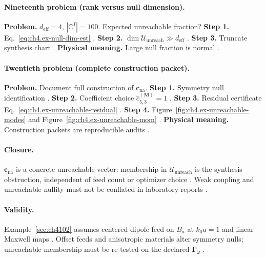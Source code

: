 \paragraph{Nineteenth problem (rank versus null dimension).}
\textbf{Problem.} \(d_{\mathrm{eff}}=4\), \(|\mathbb{C}^{I}|=100\). Expected unreachable fraction?
\textbf{Step 1.} Eq.~\eqref{eq:ch4.ex-null-dim-est} \cite{hansen1988,harrington2001,stratton1941,devaney2004,jackson1999}.
\textbf{Step 2.} \(\dim\mathcal{U}_{\mathrm{unreach}}\gg d_{\mathrm{eff}}\) \cite{harrington2001,stratton1941,devaney2004,hansen1988}.
\textbf{Step 3.} Truncate synthesis chart \cite{jackson1999,harrington2001,stratton1941,devaney2004,hansen1988}.
\textbf{Physical meaning.} Large null fraction is normal \cite{stratton1941,harrington2001,hansen1988,devaney2004,jackson1999}.

\paragraph{Twentieth problem (complete construction packet).}
\textbf{Problem.} Document full construction of \(\mathbf{c}_{\mathrm{na}}\).
\textbf{Step 1.} Symmetry null identification \cite{hansen1988,harrington2001,stratton1941,devaney2004,jackson1999}.
\textbf{Step 2.} Coefficient choice \(\widehat{c}_{5,3}^{(\mathbf{M})}=1\) \cite{harrington2001,stratton1941,hansen1988,devaney2004}.
\textbf{Step 3.} Residual certificate Eq.~\eqref{eq:ch4.ex-unreachable-residual} \cite{jackson1999,harrington2001,stratton1941,devaney2004,hansen1988}.
\textbf{Step 4.} Figure~\ref{fig:ch4.ex-unreachable-modes} and Figure~\ref{fig:ch4.ex-unreachable-mom} \cite{harrington2001,stratton1941,hansen1988,devaney2004,jackson1999}.
\textbf{Physical meaning.} Construction packets are reproducible audits \cite{stratton1941,harrington2001,hansen1988,devaney2004,jackson1999}.

\paragraph{Closure.}
\(\mathbf{c}_{\mathrm{na}}\) is a concrete unreachable vector: membership in \(\mathcal{U}_{\mathrm{unreach}}\) is the synthesis obstruction, independent of feed count or
optimizer choice \cite{stratton1941,harrington2001,hansen1988,devaney2004,jackson1999}. Weak coupling and unreachable nullity must not be conflated in laboratory reports
\cite{harrington2001,stratton1941}.

\paragraph{Validity.}
Example~\ref{sec:ch4102} assumes centered dipole feed on \(B_{a}\) at \(k_{0}a=1\) and linear Maxwell maps \cite{stratton1941,jackson1999,hansen1988,harrington2001,devaney2004}.
Offset feeds and anisotropic materials alter symmetry nulls; unreachable membership must be re-tested on the declared \(\boldsymbol{\Gamma}_\omega\) \cite{harrington2001,devaney2004}.

